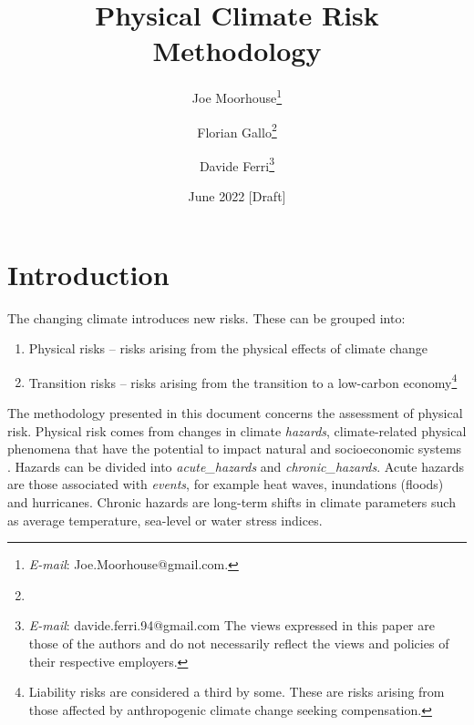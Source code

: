 \documentclass[a4paper,11pt]{extarticle} %
\title{Physical Climate Risk Methodology}
\author{Joe Moorhouse\thanks{\textit{E-mail}: Joe.Moorhouse@gmail.com.}
        \and
        Florian Gallo\thanks{}
        \and
        Davide Ferri\thanks{\textit{E-mail}:
        davide.ferri.94@gmail.com
        \smallskip
        \newline%
    The views expressed in this paper are those of the authors and do not necessarily reflect the views and policies of their respective employers.}
    }
\date{June 2022 [Draft]}
\begin{document}

\maketitle{}



\clearpage
\setcounter{tocdepth}{4}
\renewcommand{\contentsname}{Contents}
\tableofcontents




\clearpage
\section{Introduction}
\label{Sec:Introduction}

The changing climate introduces new risks. These can be grouped into:
\begin{enumerate}
	\item Physical risks -- risks arising from the physical effects of climate change
	\item Transition risks -- risks arising from the transition to a low-carbon economy\footnote{Liability risks are considered a third by some\cite{WoetzelEtAl:2020}. These are risks arising from those affected by anthropogenic climate change seeking compensation.}   
\end{enumerate}


The methodology presented in this document concerns the assessment of physical risk. Physical risk comes from changes in climate \emph{\gls{hazard}s}, climate-related physical phenomena that have the potential to impact natural and socioeconomic systems \cite{WoetzelEtAl:2020}\cite{MitchellEtAl:2017}. Hazards can be divided into \emph{\gls{acute_hazard}s} and \emph{\gls{chronic_hazard}s}. Acute hazards are those associated with \emph{events}, for example heat waves, inundations (floods) and hurricanes. Chronic hazards are long-term shifts in climate parameters such as average temperature, sea-level or water stress indices.  
\end{document}
